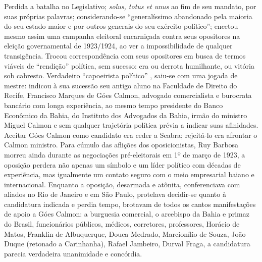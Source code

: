 Perdida a batalha no Legislativo; \textit{solus, totus et unus} ao fim de seu mandato, por suas próprias palavras; considerando-se ``generalíssimo abandonado pela maioria do seu estado maior e por outros generais do seu exército político''; encetou mesmo assim uma campanha eleitoral encarniçada contra seus opositores na eleição governamental de 1923/1924, ao ver a impossibilidade de qualquer transigência. Trocou correspondência com seus opositores em busca de termos viáveis de ``rendição'' política, sem sucesso: era ou derrota humilhante, ou vitória sob cabresto. Verdadeiro ``capoeirista político'' \cite[p.~133]{sampaio_partidos_1978}, saiu-se com uma jogada de mestre: indicou à sua sucessão seu antigo aluno na Faculdade de Direito do Recife, Francisco Marques de Góes Calmon, advogado comercialista e burocrata bancário com longa experiência, ao mesmo tempo presidente do Banco Econômico da Bahia, do Instituto dos Advogados da Bahia, irmão do ministro Miguel Calmon e sem qualquer trajetória política prévia a indicar suas afinidades. Aceitar Góes Calmon como candidato era ceder a Seabra; rejeitá-lo era afrontar o Calmon ministro. Para cúmulo das aflições dos oposicionistas, Ruy Barbosa morreu ainda durante as negociações pré-eleitorais em 1º de março de 1923, a oposição perdera não apenas um símbolo e um líder político com décadas de experiẽncia, mas igualmente um contato seguro com o meio empresarial baiano e internacional. Enquanto a oposição, desarmada e atônita, conferenciava com aliados no Rio de Janeiro e em São Paulo, protelava decidir-se quanto à candidatura indicada e perdia tempo, brotavam de todos os cantos manifestações de apoio a Góes Calmon: a burguesia comercial, o arcebispo da Bahia e primaz do Brasil, funcionários públicos, médicos, corretores, professores, Horácio de Matos, Franklin de Albuquerque, Douca Medrado, Marcionílio de Souza, João Duque (retonado a Carinhanha), Rafael Jambeiro, Durval Fraga, a candidatura parecia verdadeira unanimidade e concórdia. 

